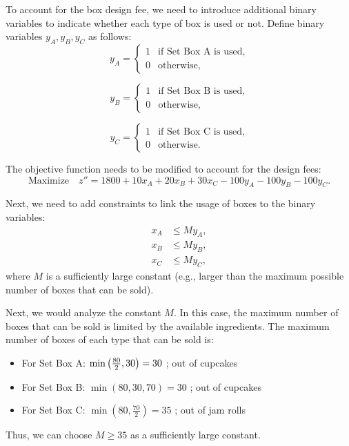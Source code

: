 \documentclass[a4paper, 10pt]{article}
\begin{document}
\begin{solution}
To account for the box design fee, we need to introduce additional binary variables to indicate whether each type of box is used or not.
Define binary variables \( y_A, y_B, y_C \) as follows:
\[ y_A =
\begin{cases}
1 & \text{if Set Box A is used}, \\
0 & \text{otherwise},
\end{cases} \]

\[ y_B =
\begin{cases}
1 & \text{if Set Box B is used}, \\
0 & \text{otherwise},
\end{cases} \]

\[ y_C =
\begin{cases}
1 & \text{if Set Box C is used}, \\
0 & \text{otherwise}.
\end{cases} \]

The objective function needs to be modified to account for the design fees:
\[ \text{Maximize} \quad z'' = 1800 + 10x_A + 20x_B + 30x_C - 100y_A - 100y_B - 100y_C. \]

Next, we need to add constraints to link the usage of boxes to the binary variables:
\begin{align*}
    x_A & \leq M y_A, \\
    x_B & \leq M y_B, \\
    x_C & \leq M y_C,
\end{align*}
where \( M \) is a sufficiently large constant (e.g., larger than the maximum possible number of boxes that can be sold).

\vspace{4mm}

Next, we would analyze the constant \( M \).
In this case, the maximum number of boxes that can be sold is limited by the available ingredients.
The maximum number of boxes of each type that can be sold is:
\begin{itemize}
    \item For Set Box A: \( \min\left(\frac{80}{2}, 30\right) = 30 \) ; out of cupcakes
    \item For Set Box B: \( \min(80, 30, 70) = 30 \) ; out of cupcakes
    \item For Set Box C: \( \min(80, \frac{70}{2}) = 35 \) ; out of jam rolls
\end{itemize}
Thus, we can choose \( M \ge 35 \) as a sufficiently large constant.


\end{solution}
\end{document}
